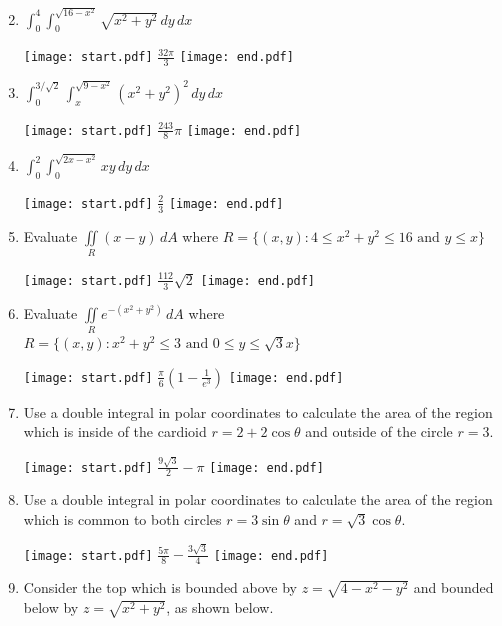 \documentclass[12pt]{article}
\begin{document}

\begin{enumerate}
\setcounter{enumi}{1}

\item $\int_0^{4} \int_0^{\sqrt{16-x^2}} \sqrt{x^2+y^2} \,dy \,dx$

\texttt{[image: start.pdf]}
{{$\frac{32\pi}{3}$}}
\texttt{[image: end.pdf]}


\item $\int_0^{3/\sqrt{2}} \int_x^{\sqrt{9-x^2}} \left(x^2+y^2\right)^2 \,dy \,dx$

\texttt{[image: start.pdf]}
{{$\frac{243}{8}\pi$}}
\texttt{[image: end.pdf]}


\item $\int_0^{2} \int_0^{\sqrt{2x-x^2}} xy \,dy \,dx$

\texttt{[image: start.pdf]}
{{$\frac{2}{3}$}}
\texttt{[image: end.pdf]}


\item Evaluate $\iint \limits_{R} (x-y) \,dA$ where $R=\{(x,y): 4 \leq x^2+y^2 \leq 16 \text{ and } y \leq x\}$

\texttt{[image: start.pdf]}
{{$\frac{112}{3}\sqrt{2}$}}
\texttt{[image: end.pdf]}


\item Evaluate $\iint \limits_{R} e^{-(x^2+y^2)} \,dA$ where $R=\{(x,y): x^2+y^2 \leq 3 \text{ and } 0 \leq y \leq \sqrt{3}x\}$

\texttt{[image: start.pdf]}
{{$\frac{\pi}{6}\left(1-\frac{1}{e^3}\right)$}}
\texttt{[image: end.pdf]}


\item Use a double integral in polar coordinates to calculate the area of the region which is inside of the cardioid $r=2+2\cos{\theta}$ and outside of the circle $r=3$.

\texttt{[image: start.pdf]}
{{$\frac{9\sqrt{3}}{2}-\pi$}}
\texttt{[image: end.pdf]}


\item Use a double integral in polar coordinates to calculate the area of the region which is common to both circles $r=3\sin{\theta}$ and $r=\sqrt{3}\cos{\theta}$.

\texttt{[image: start.pdf]}
{{$\frac{5\pi}{8}-\frac{3\sqrt{3}}{4}$}}
\texttt{[image: end.pdf]}


\item Consider the top which is bounded above by $z=\sqrt{4-x^2-y^2}$ and bounded below by $z=\sqrt{x^2+y^2}$, as shown below.


\end{enumerate}
\end{document}
